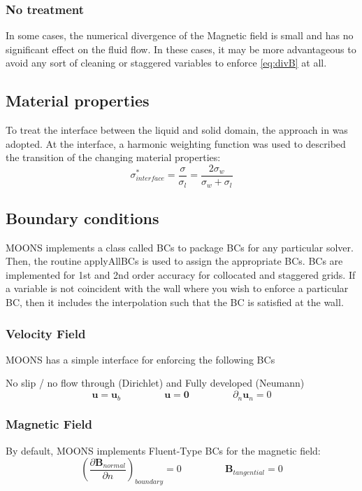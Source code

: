 \documentclass[11pt]{article}
\newcommand{\eqtab}{\;\;\;\;\;\;\;\;\;\;\;\;\;\;\;\;}
\begin{document}
\subsubsection{No treatment}
In some cases, the numerical divergence of the Magnetic field is small and has no significant effect on the fluid flow. In these cases, it may be more advantageous to avoid any sort of cleaning or staggered variables to enforce \ref{eq:divB} at all.


\subsection{Material properties}
To treat the interface between the liquid and solid domain, the approach in \cite{Carvalho2013} was adopted. At the interface, a harmonic weighting function was used to described the transition of the changing material properties:
\begin{equation*}
\sigma^*_{interface} = \frac{\sigma}{\sigma_l} = \frac{2 \sigma_w}{\sigma_w + \sigma_l}
\end{equation*}


\subsection{Boundary conditions}
MOONS implements a class called BCs to package BCs for any particular solver. Then, the routine applyAllBCs is used to assign the appropriate BCs. BCs are implemented for 1st and 2nd order accuracy for collocated and staggered grids. If a variable is not coincident with the wall where you wish to enforce a particular BC, then it includes the interpolation such that the BC is satisfied at the wall. 

\subsubsection{Velocity Field}
MOONS has a simple interface for enforcing the following BCs

No slip / no flow through (Dirichlet) and Fully developed (Neumann)
\begin{equation*}
\pmb{u} = \pmb{u}_{b} \eqtab
\pmb{u} = \pmb{0} \eqtab
\partial_n \pmb{u}_n = 0
\end{equation*}

\subsubsection{Magnetic Field}
By default, MOONS implements Fluent-Type BCs for the magnetic field:
\begin{equation*} 
\left( \frac{\partial \pmb{B}_{normal}}{\partial n} \right)_{boundary} = 0 \eqtab
\pmb{B}_{tangential} = 0
\end{equation*}
\end{document}
